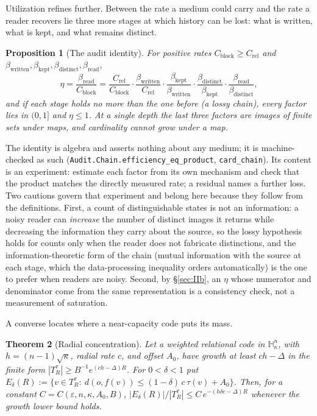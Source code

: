 \documentclass[11pt,reqno]{amsart}
\theoremstyle{plain}
\newtheorem{theorem}{Theorem}[section]
\newtheorem{proposition}[theorem]{Proposition}
\theoremstyle{definition}
\newcommand{\Crel}{C_{\mathrm{rel}}}
\newcommand{\Cblock}{C_{\mathrm{block}}}
\newcommand{\Hk}{\mathbb{H}^n_\kappa}
\newcommand{\eps}{\varepsilon}
\begin{document}
Utilization refines further. Between the rate a medium could carry and the rate a reader recovers lie three more stages at which history can be lost: what is written, what is kept, and what remains distinct.

\begin{proposition}[The audit identity]\label{prop:audit}
For positive rates $\Cblock\ge\Crel$ and $\beta_{\mathrm{written}},\beta_{\mathrm{kept}},\beta_{\mathrm{distinct}},\beta_{\mathrm{read}}$,
\[
\eta=\frac{\beta_{\mathrm{read}}}{\Cblock}
=\frac{\Crel}{\Cblock}\cdot\frac{\beta_{\mathrm{written}}}{\Crel}\cdot\frac{\beta_{\mathrm{kept}}}{\beta_{\mathrm{written}}}\cdot\frac{\beta_{\mathrm{distinct}}}{\beta_{\mathrm{kept}}}\cdot\frac{\beta_{\mathrm{read}}}{\beta_{\mathrm{distinct}}},
\]
and if each stage holds no more than the one before (a \emph{lossy} chain), every factor lies in $(0,1]$ and $\eta\le1$. At a single depth the last three factors are images of finite sets under maps, and cardinality cannot grow under a map.
\end{proposition}

The identity is algebra and asserts nothing about any medium; it is machine-checked as such (\texttt{Audit.Chain.efficiency\_eq\_product}, \texttt{card\_chain}). Its content is an experiment: estimate each factor from its own mechanism and check that the product matches the directly measured rate; a residual names a further loss. Two cautions govern that experiment and belong here because they follow from the definitions. First, a count of distinguishable states is not an information: a noisy reader can \emph{increase} the number of distinct images it returns while decreasing the information they carry about the source, so the lossy hypothesis holds for counts only when the reader does not fabricate distinctions, and the information-theoretic form of the chain (mutual information with the source at each stage, which the data-processing inequality orders automatically) is the one to prefer when readers are noisy. Second, by \S\ref{sec:IIb}, an $\eta$ whose numerator and denominator come from the same representation is a consistency check, not a measurement of saturation.

A converse locates where a near-capacity code puts its mass.

\begin{theorem}[Radial concentration]\label{thm:radial}
Let a weighted relational code in $\Hk$, with $h=(n-1)\sqrt\kappa$, radial rate $c$, and offset $A_0$, have growth at least $ch-\Delta$ in the finite form $|T_R^\tau|\ge B^{-1}e^{(ch-\Delta)R}$. For $0<\delta<1$ put $E_\delta(R):=\{v\in T_R^\tau:\ d(o,f(v))\le(1-\delta)\,c\,\tau(v)+A_0\}$. Then, for a constant $C=C(\eps,n,\kappa,A_0,B)$, $|E_\delta(R)|/|T_R^\tau|\le C\,e^{-(h\delta c-\Delta)R}$ whenever the growth lower bound holds.
\end{theorem}
\end{document}
